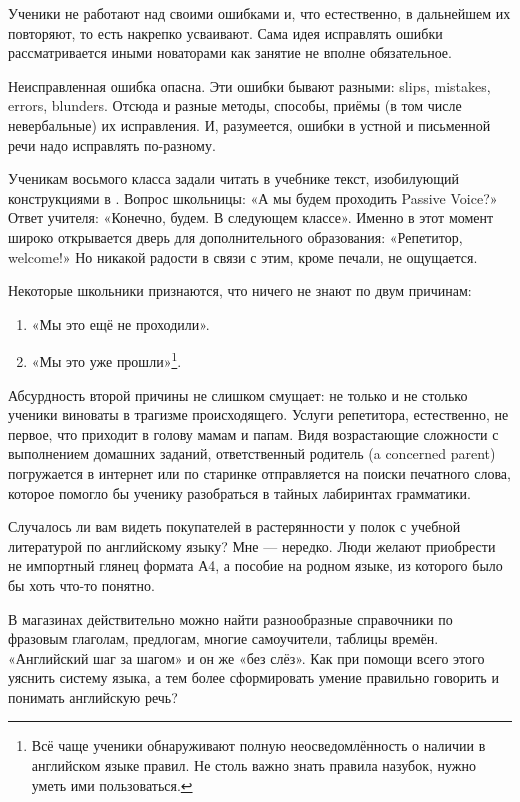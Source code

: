 Ученики не работают над своими ошибками и, что естественно, в дальнейшем их повторяют, то есть накрепко усваивают. Сама идея исправлять ошибки рассматривается иными новаторами как занятие не вполне обязательное.

Неисправленная ошибка опасна. Эти ошибки бывают разными: slips, mistakes, errors, blunders. Отсюда и разные методы, способы, приёмы (в том числе невербальные) их исправления. И, разумеется, ошибки в устной и письменной речи надо исправлять по-разному.

Ученикам восьмого класса задали читать в учебнике текст, изобилующий конструкциями в . Вопрос школьницы: «А мы будем проходить Passive Voice?» Ответ учителя: «Конечно, будем. В следующем классе». Именно в этот момент широко открывается дверь для дополнительного образования: «Репетитор, welcome!» Но никакой радости в связи с этим, кроме печали, не ощущается.

Некоторые школьники признаются, что ничего не знают по двум причинам:

\begin{enumerate}
    \item «Мы это ещё не проходили».
    \item «Мы это уже прошли»\footnote{Всё чаще ученики обнаруживают полную неосведомлённость о наличии в английском языке правил. Не столь важно знать правила назубок, нужно уметь ими пользоваться.}.
\end{enumerate}

Абсурдность второй причины не слишком смущает: не только и не столько ученики виноваты в трагизме происходящего. Услуги репетитора, естественно, не первое, что приходит в голову мамам и папам. Видя возрастающие сложности с выполнением домашних заданий, ответственный родитель (a concerned parent) погружается в интернет или по старинке отправляется на поиски печатного слова, которое помогло бы ученику разобраться в тайных лабиринтах грамматики.

Случалось ли вам видеть покупателей в растерянности у полок с учебной литературой по английскому языку? Мне --- нередко. Люди желают приобрести не импортный глянец формата А4, а пособие на родном языке, из которого было бы хоть что-то понятно.

В магазинах действительно можно найти разнообразные справочники по фразовым глаголам, предлогам, многие самоучители, таблицы времён. «Английский шаг за шагом» и он же «без слёз». Как при помощи всего этого уяснить систему языка, а тем более сформировать умение правильно говорить и понимать английскую речь?

